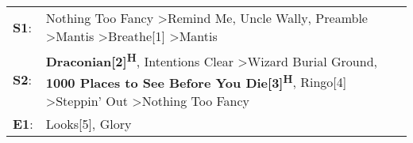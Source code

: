 \begin{supertabular}{p{0.03\textwidth}p{0.92\textwidth}}
 \textbf{S1}:  &                                                                Nothing Too Fancy\textsuperscript{} \textgreater \enspace Remind Me\textsuperscript{}, \enspace Uncle Wally\textsuperscript{}, \enspace Preamble\textsuperscript{} \textgreater \enspace Mantis\textsuperscript{} \textgreater \enspace Breathe[1]\textsuperscript{} \textgreater \enspace Mantis\textsuperscript{}  \enspace  \\
 \textbf{S2}:  &  \textbf{Draconian[2]\textsuperscript{H}}, \enspace Intentions Clear\textsuperscript{} \textgreater \enspace Wizard Burial Ground\textsuperscript{}, \enspace \textbf{1000 Places to See Before You Die[3]\textsuperscript{H}}, \enspace Ringo[4]\textsuperscript{} \textgreater \enspace Steppin' Out\textsuperscript{} \textgreater \enspace Nothing Too Fancy\textsuperscript{}  \enspace  \\
 \textbf{E1}:  &                                                                                                                                                                                                                                                                                                                       Looks[5]\textsuperscript{}, \enspace Glory\textsuperscript{}  \enspace  \\
\end{supertabular}
